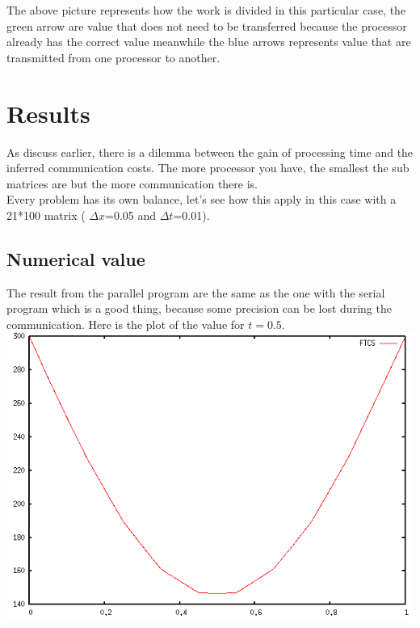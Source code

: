 \documentclass[12pt, a4paper]{report}
\begin{document}
The above picture represents how the work is divided in this particular case, the green arrow are value that does not need to be transferred because the processor already has the correct value meanwhile the blue arrows represents value that are transmitted from one processor to another.
\section{Results}
	As discuss earlier, there is a dilemma between the gain of processing time and the inferred communication costs. The more processor you have, the smallest the sub matrices are but the more communication there is.\\
	Every problem has its own balance, let's see how this apply in this case with a 21*100 matrix ( $\Delta x$=0.05 and $\Delta t$=0.01).
\subsection{Numerical value}
	The result from the parallel program are the same as the one with the serial program which is a good thing, because some precision can be lost during the communication. Here is the plot of the value for $t=0.5$.\\
\includegraphics[scale=0.5]{report/FTCS}
\end{document}
